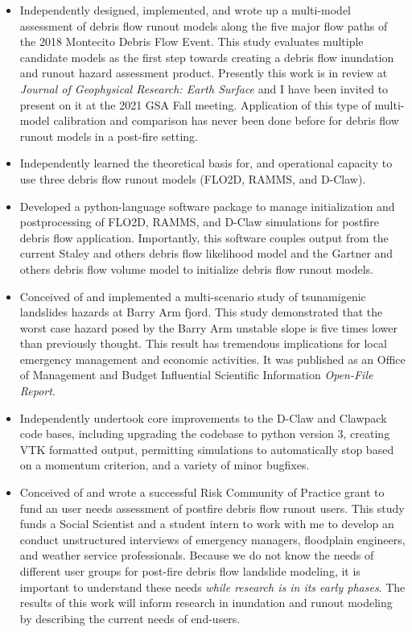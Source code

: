 \documentclass[10pt]{article}
\begin{document}
\begin{itemize}

\item Independently designed, implemented, and wrote up a multi-model assessment of debris flow runout models along the five major flow paths of the 2018 Montecito Debris Flow Event. This study evaluates multiple candidate models as the first step towards creating a debris flow inundation and runout hazard assessment product. Presently this work is in review at \textit{Journal of Geophysical Research: Earth Surface} and I have been invited to present on it at the 2021 GSA Fall meeting. Application of this type of multi-model calibration and comparison has never been done before for debris flow runout models in a post-fire setting.
\item Independently learned the theoretical basis for, and operational capacity to use three debris flow runout models (FLO2D, RAMMS, and D-Claw).   
\item Developed a python-language software package to manage initialization and postprocessing of FLO2D, RAMMS, and D-Claw simulations for postfire debris flow application. Importantly, this software couples output from the current Staley and others debris flow likelihood model and the Gartner and others debris flow volume model to initialize debris flow runout models. 
\item Conceived of and implemented a multi-scenario study of tsunamigenic landslides hazards at Barry Arm fjord. This study demonstrated that the worst case hazard posed by the Barry Arm unstable slope is five times lower than previously thought. This result has tremendous implications for local emergency management and economic activities. It was published as an Office of Management and Budget Influential Scientific Information \textit{Open-File Report}. 
\item Independently undertook core improvements to the D-Claw and Clawpack code bases, including upgrading the codebase to python version 3, creating VTK formatted output, permitting simulations to automatically stop based on a momentum criterion, and a variety of minor bugfixes.  
\item Conceived of and wrote a successful Risk Community of Practice grant to fund an user needs assessment of postfire debris flow runout users. This study funds a Social Scientist and a student intern to work with me to develop an conduct unstructured interviews of emergency managers, floodplain engineers, and weather service professionals. Because we do not know the needs of different user groups for post-fire debris flow landslide modeling, it is important to understand these needs \textit{while research is in its early phases}. The results of this work will inform research in inundation and runout modeling by describing the current needs of end-users. 

\end{itemize}
\end{document}
